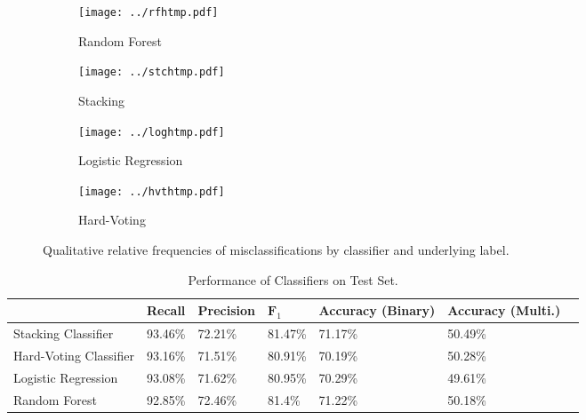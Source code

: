 \documentclass[10pt, twoside, a4paper]{article}
\begin{document}
	\begin{figure}
		\centering
		\begin{subfigure}{.3\textwidth}
		\centering
		\texttt{[image: ../rfhtmp.pdf]}
		\caption{Random Forest}
		\end{subfigure}\hspace{-3mm}%
		\begin{subfigure}{.2\textwidth}
		\centering
		\texttt{[image: ../stchtmp.pdf]}
		\caption{Stacking}
		\end{subfigure}%
		\begin{subfigure}{.2\textwidth}
		\centering
		\texttt{[image: ../loghtmp.pdf]}
		\caption{Logistic Regression}
		\end{subfigure}%
		\begin{subfigure}{.2\textwidth}
		\centering
		\texttt{[image: ../hvthtmp.pdf]}
		\caption{Hard-Voting}
		\end{subfigure}%
		\caption{Qualitative relative frequencies of misclassifications by classifier and 
		underlying label.}
		\label{figure:misclheat}
	\end{figure}

	\begin{table}
	\begin{center}
		\begin{tabular}{R{4.65cm}C{1.8cm}C{1.8cm}C{1.8cm}C{1.8cm}C{1.8cm}C{0.1cm}}
		& \textbf{Recall} & \textbf{Precision} & $\mathbf{F}_1$ & \textbf{Accuracy} 
		(Binary)& \textbf{Accuracy} (Multi.) &\\[10pt]
		\hline
		Stacking Classifier & 93.46\% & 72.21\% & 81.47\% & 71.17\%    &50.49\%&\\[10pt]
		Hard-Voting Classifier & 93.16\% & 71.51\% & 80.91\% & 70.19\% &50.28\%&\\[10pt]
		Logistic Regression & 93.08\% & 71.62\% & 80.95\% & 70.29\%    &49.61\%&\\[10pt]
		Random Forest & 92.85\% & 72.46\% & 81.4\% & 71.22\%           &50.18\%&\\[10pt]
		\end{tabular}
			    
	\caption{Performance of Classifiers on Test Set.}	
	\label{table:testeval}
	\end{center}
	\end{table}
\end{document}
